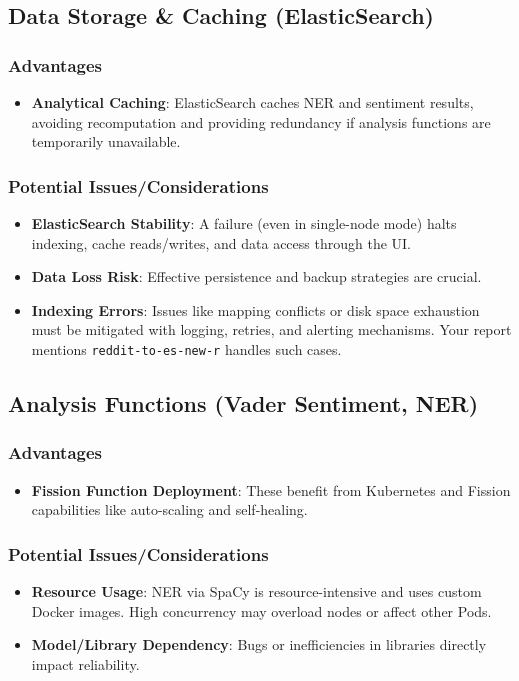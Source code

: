 \documentclass[]{article}
\numberwithin{equation}{section}
\begin{document}
\subsection*{Data Storage \& Caching (ElasticSearch)}

\subsubsection*{Advantages}
\begin{itemize}
  \item \textbf{Analytical Caching}: ElasticSearch caches NER and sentiment results, avoiding recomputation and providing redundancy if analysis functions are temporarily unavailable.
\end{itemize}

\subsubsection*{Potential Issues/Considerations}
\begin{itemize}
  \item \textbf{ElasticSearch Stability}: A failure (even in single-node mode) halts indexing, cache reads/writes, and data access through the UI.
  \item \textbf{Data Loss Risk}: Effective persistence and backup strategies are crucial.
  \item \textbf{Indexing Errors}: Issues like mapping conflicts or disk space exhaustion must be mitigated with logging, retries, and alerting mechanisms. Your report mentions \texttt{reddit-to-es-new-r} handles such cases.
\end{itemize}

\subsection*{Analysis Functions (Vader Sentiment, NER)}

\subsubsection*{Advantages}
\begin{itemize}
  \item \textbf{Fission Function Deployment}: These benefit from Kubernetes and Fission capabilities like auto-scaling and self-healing.
\end{itemize}

\subsubsection*{Potential Issues/Considerations}
\begin{itemize}
  \item \textbf{Resource Usage}: NER via SpaCy is resource-intensive and uses custom Docker images. High concurrency may overload nodes or affect other Pods.
  \item \textbf{Model/Library Dependency}: Bugs or inefficiencies in libraries directly impact reliability.
\end{itemize}
\end{document}
